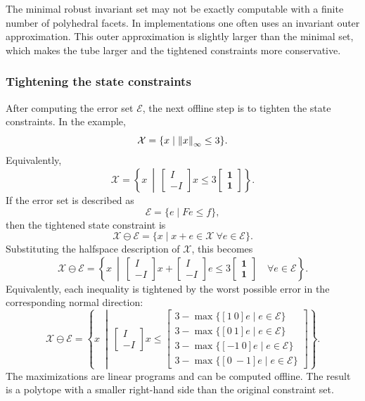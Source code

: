 \begin{remark}
The minimal robust invariant set may not be exactly computable with a finite number of
polyhedral facets. In implementations one often uses an invariant outer approximation. This
outer approximation is slightly larger than the minimal set, which makes the tube larger and the
tightened constraints more conservative.
\end{remark}

\subsubsection{Tightening the state constraints}

After computing the error set \(\mathcal E\), the next offline step is to tighten the state
constraints. In the example,
\[
    \mathcal X
    =
    \{x\mid \left\lVert x \right\rVert_\infty\leq 3\}.
\]
Equivalently,
\[
    \mathcal X
    =
    \left\{
    x\ \middle|\ 
    \begin{bmatrix}
        I\\
        -I
    \end{bmatrix}
    x
    \leq
    3
    \begin{bmatrix}
        \mathbf 1\\
        \mathbf 1
    \end{bmatrix}
    \right\}.
\]
If the error set is described as
\[
    \mathcal E=\{e\mid Fe\leq f\},
\]
then the tightened state constraint is
\[
    \mathcal X\ominus\mathcal E
    =
    \{x\mid x+e\in\mathcal X\ \forall e\in\mathcal E\}.
\]
Substituting the halfspace description of \(\mathcal X\), this becomes
\[
    \mathcal X\ominus\mathcal E
    =
    \left\{
    x\ \middle|\ 
    \begin{bmatrix}
        I\\
        -I
    \end{bmatrix}x
    +
    \begin{bmatrix}
        I\\
        -I
    \end{bmatrix}e
    \leq
    3
    \begin{bmatrix}
        \mathbf 1\\
        \mathbf 1
    \end{bmatrix}
    \quad
    \forall e\in\mathcal E
    \right\}.
\]
Equivalently, each inequality is tightened by the worst possible error in the corresponding
normal direction:
\[
    \mathcal X\ominus\mathcal E
    =
    \left\{
    x\ \middle|\ 
    \begin{bmatrix}
        I\\
        -I
    \end{bmatrix}x
    \leq
    \begin{bmatrix}
        3-\max\{[1\ 0]e\mid e\in\mathcal E\}\\
        3-\max\{[0\ 1]e\mid e\in\mathcal E\}\\
        3-\max\{[-1\ 0]e\mid e\in\mathcal E\}\\
        3-\max\{[0\ -1]e\mid e\in\mathcal E\}
    \end{bmatrix}
    \right\}.
\]
The maximizations are linear programs and can be computed offline. The result is a polytope
with a smaller right-hand side than the original constraint set.


